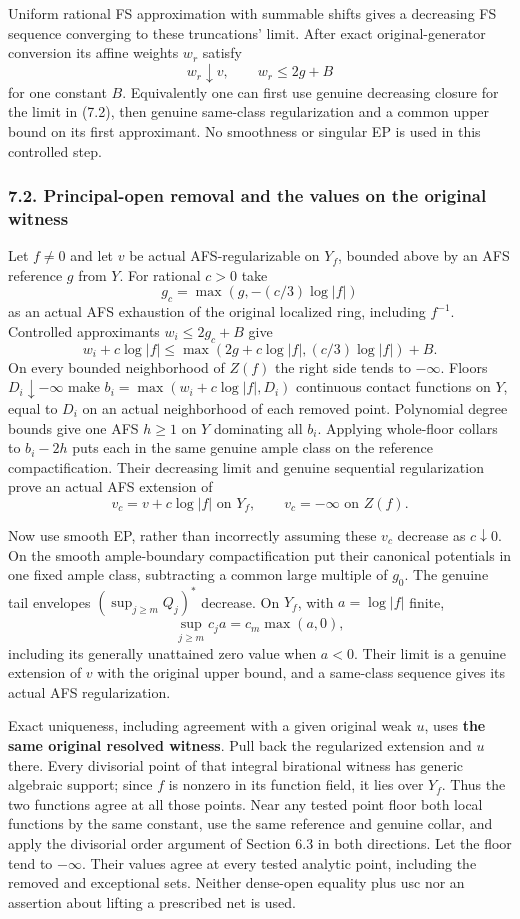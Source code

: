 \documentclass[
  10pt,
]{article}
\begin{document}
Uniform rational FS approximation with summable shifts gives a
decreasing FS sequence converging to these truncations' limit. After
exact original-generator conversion its affine weights \(w_r\) satisfy
\[w_r\downarrow v,\qquad w_r\le2g+B\] for one constant \(B\).
Equivalently one can first use genuine decreasing closure for the limit
in (7.2), then genuine same-class regularization and a common upper
bound on its first approximant. No smoothness or singular EP is used in
this controlled step.

\subsubsection{7.2. Principal-open removal and the values on the
original
witness}\label{principal-open-removal-and-the-values-on-the-original-witness}

Let \(f\ne0\) and let \(v\) be actual AFS-regularizable on \(Y_f\),
bounded above by an AFS reference \(g\) from \(Y\). For rational \(c>0\)
take \[g_c=\max(g,-(c/3)\log|f|)\] as an actual AFS exhaustion of the
original localized ring, including \(f^{-1}\). Controlled approximants
\(w_i\le2g_c+B\) give
\[w_i+c\log|f|\le\max(2g+c\log|f|,(c/3)\log|f|)+B. \tag{7.3}\] On every
bounded neighborhood of \(Z(f)\) the right side tends to \(-\infty\).
Floors \(D_i\downarrow-\infty\) make \(b_i=\max(w_i+c\log|f|,D_i)\)
continuous contact functions on \(Y\), equal to \(D_i\) on an actual
neighborhood of each removed point. Polynomial degree bounds give one
AFS \(h\ge1\) on \(Y\) dominating all \(b_i\). Applying whole-floor
collars to \(b_i-2h\) puts each in the same genuine ample class on the
reference compactification. Their decreasing limit and genuine
sequential regularization prove an actual AFS extension of
\[v_c=v+c\log|f|\text{ on }Y_f,\qquad v_c=-\infty\text{ on }Z(f).\]

Now use smooth EP, rather than incorrectly assuming these \(v_c\)
decrease as \(c\downarrow0\). On the smooth ample-boundary
compactification put their canonical potentials in one fixed ample
class, subtracting a common large multiple of \(g_0\). The genuine tail
envelopes \((\sup_{j\ge m}Q_j)^*\) decrease. On \(Y_f\), with
\(a=\log|f|\) finite, \[\sup_{j\ge m}c_j a=c_m\max(a,0),\] including its
generally unattained zero value when \(a<0\). Their limit is a genuine
extension of \(v\) with the original upper bound, and a same-class
sequence gives its actual AFS regularization.

Exact uniqueness, including agreement with a given original weak \(u\),
uses \textbf{the same original resolved witness}. Pull back the
regularized extension and \(u\) there. Every divisorial point of that
integral birational witness has generic algebraic support; since \(f\)
is nonzero in its function field, it lies over \(Y_f\). Thus the two
functions agree at all those points. Near any tested point floor both
local functions by the same constant, use the same reference and genuine
collar, and apply the divisorial order argument of Section 6.3 in both
directions. Let the floor tend to \(-\infty\). Their values agree at
every tested analytic point, including the removed and exceptional sets.
Neither dense-open equality plus usc nor an assertion about lifting a
prescribed net is used.
\end{document}
